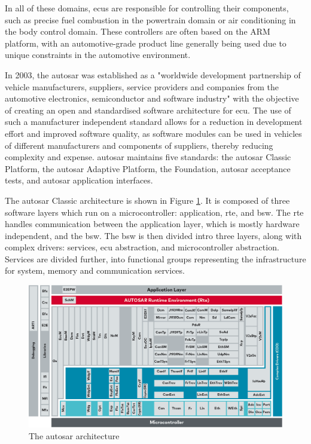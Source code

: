 In all of these domains, \glspl{ecu} are responsible for controlling their components, such as precise fuel combustion in the powertrain domain or air conditioning in the body control domain. These controllers are often based on the ARM platform, with an automotive-grade product line generally being used due to unique constraints in the automotive environment.\par

In 2003, the \gls{autosar} was established as a "worldwide development partnership of vehicle manufacturers, suppliers, service providers and companies from the automotive electronics, semiconductor and software industry" with the objective of creating an open and standardised software architecture for \gls{ecu}. The use of such a manufacturer independent standard allows for a reduction in development effort and improved software quality, as software modules can be used in vehicles of different manufacturers and components of suppliers, thereby reducing complexity and expense. \gls{autosar} maintains five standards: the \gls{autosar} Classic Platform, the \gls{autosar} Adaptive Platform, the Foundation, \gls{autosar} acceptance tests, and \gls{autosar} application interfaces.\par

The \gls{autosar} Classic architecture is shown in Figure \ref{fig:autosar_arch}. It is composed of three software layers which run on a microcontroller: application, \gls{rte}, and \gls{bsw}. The \gls{rte} handles communication between the application layer, which is mostly hardware independent, and the \gls{bsw}. The \gls{bsw} is then divided intro three layers, along with complex drivers: services, \gls{ecu} abstraction, and microcontroller abstraction. Services are divided further, into functional groups representing the infrastructure for system, memory and communication services.

\begin{figure}
    \centering
    \includegraphics[width = \linewidth]{img/parts/introduction/AUTOSAR.png}
    \caption{The \gls{autosar} architecture \citep{autosar_arch}}
    \label{fig:autosar_arch}
\end{figure}

